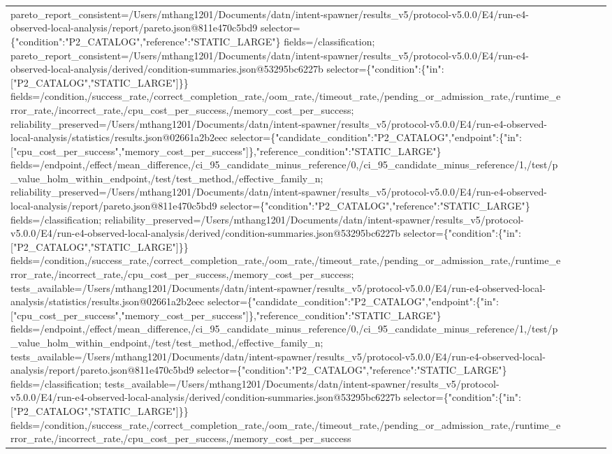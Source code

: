 \begin{tabular}{lllll}
pareto\_report\_consistent=/Users/mthang1201/Documents/datn/intent-spawner/results\_v5/protocol-v5.0.0/E4/run-e4-observed-local-analysis/report/pareto.json@811e470c5bd9 selector=\{"condition":"P2\_CATALOG","reference":"STATIC\_LARGE"\} fields=/classification; pareto\_report\_consistent=/Users/mthang1201/Documents/datn/intent-spawner/results\_v5/protocol-v5.0.0/E4/run-e4-observed-local-analysis/derived/condition-summaries.json@53295bc6227b selector=\{"condition":\{"in":["P2\_CATALOG","STATIC\_LARGE"]\}\} fields=/condition,/success\_rate,/correct\_completion\_rate,/oom\_rate,/timeout\_rate,/pending\_or\_admission\_rate,/runtime\_error\_rate,/incorrect\_rate,/cpu\_cost\_per\_success,/memory\_cost\_per\_success; reliability\_preserved=/Users/mthang1201/Documents/datn/intent-spawner/results\_v5/protocol-v5.0.0/E4/run-e4-observed-local-analysis/statistics/results.json@02661a2b2eec selector=\{"candidate\_condition":"P2\_CATALOG","endpoint":\{"in":["cpu\_cost\_per\_success","memory\_cost\_per\_success"]\},"reference\_condition":"STATIC\_LARGE"\} fields=/endpoint,/effect/mean\_difference,/ci\_95\_candidate\_minus\_reference/0,/ci\_95\_candidate\_minus\_reference/1,/test/p\_value\_holm\_within\_endpoint,/test/test\_method,/effective\_family\_n; reliability\_preserved=/Users/mthang1201/Documents/datn/intent-spawner/results\_v5/protocol-v5.0.0/E4/run-e4-observed-local-analysis/report/pareto.json@811e470c5bd9 selector=\{"condition":"P2\_CATALOG","reference":"STATIC\_LARGE"\} fields=/classification; reliability\_preserved=/Users/mthang1201/Documents/datn/intent-spawner/results\_v5/protocol-v5.0.0/E4/run-e4-observed-local-analysis/derived/condition-summaries.json@53295bc6227b selector=\{"condition":\{"in":["P2\_CATALOG","STATIC\_LARGE"]\}\} fields=/condition,/success\_rate,/correct\_completion\_rate,/oom\_rate,/timeout\_rate,/pending\_or\_admission\_rate,/runtime\_error\_rate,/incorrect\_rate,/cpu\_cost\_per\_success,/memory\_cost\_per\_success; tests\_available=/Users/mthang1201/Documents/datn/intent-spawner/results\_v5/protocol-v5.0.0/E4/run-e4-observed-local-analysis/statistics/results.json@02661a2b2eec selector=\{"candidate\_condition":"P2\_CATALOG","endpoint":\{"in":["cpu\_cost\_per\_success","memory\_cost\_per\_success"]\},"reference\_condition":"STATIC\_LARGE"\} fields=/endpoint,/effect/mean\_difference,/ci\_95\_candidate\_minus\_reference/0,/ci\_95\_candidate\_minus\_reference/1,/test/p\_value\_holm\_within\_endpoint,/test/test\_method,/effective\_family\_n; tests\_available=/Users/mthang1201/Documents/datn/intent-spawner/results\_v5/protocol-v5.0.0/E4/run-e4-observed-local-analysis/report/pareto.json@811e470c5bd9 selector=\{"condition":"P2\_CATALOG","reference":"STATIC\_LARGE"\} fields=/classification; tests\_available=/Users/mthang1201/Documents/datn/intent-spawner/results\_v5/protocol-v5.0.0/E4/run-e4-observed-local-analysis/derived/condition-summaries.json@53295bc6227b selector=\{"condition":\{"in":["P2\_CATALOG","STATIC\_LARGE"]\}\} fields=/condition,/success\_rate,/correct\_completion\_rate,/oom\_rate,/timeout\_rate,/pending\_or\_admission\_rate,/runtime\_error\_rate,/incorrect\_rate,/cpu\_cost\_per\_success,/memory\_cost\_per\_success \\

\end{tabular}
